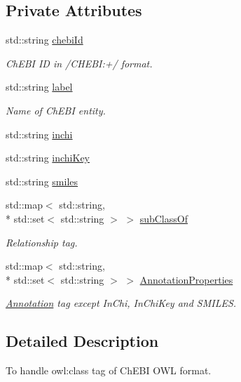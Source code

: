 \subsection*{Private Attributes}
\begin{DoxyCompactItemize}
\item 
std\-::string \hyperlink{classunisys_1_1ChEBIOWLClass_ab117174852af50b086c9baf28647be85}{chebi\-Id}
\begin{DoxyCompactList}\small\item\em Ch\-E\-B\-I I\-D in /\-C\-H\-E\-B\-I\-:+/ format. \end{DoxyCompactList}\item 
std\-::string \hyperlink{classunisys_1_1ChEBIOWLClass_a5069859deb537ea460525e98d277397c}{label}
\begin{DoxyCompactList}\small\item\em Name of Ch\-E\-B\-I entity. \end{DoxyCompactList}\item 
std\-::string \hyperlink{classunisys_1_1ChEBIOWLClass_a46b2c202643987ce0d4e3a105e117822}{inchi}
\item 
std\-::string \hyperlink{classunisys_1_1ChEBIOWLClass_af64b976dc7f141a4935898fcb470cefb}{inchi\-Key}
\item 
std\-::string \hyperlink{classunisys_1_1ChEBIOWLClass_ad36fc8f28f36623552de31e77095e570}{smiles}
\item 
std\-::map$<$ std\-::string, \\*
std\-::set$<$ std\-::string $>$ $>$ \hyperlink{classunisys_1_1ChEBIOWLClass_afac1eca0e61d1adcebd6d1feda765a63}{sub\-Class\-Of}
\begin{DoxyCompactList}\small\item\em Relationship tag. \end{DoxyCompactList}\item 
std\-::map$<$ std\-::string, \\*
std\-::set$<$ std\-::string $>$ $>$ \hyperlink{classunisys_1_1ChEBIOWLClass_a4f4fec0580d988965e1ab42c8aecbb59}{Annotation\-Properties}
\begin{DoxyCompactList}\small\item\em \hyperlink{classunisys_1_1Annotation}{Annotation} tag except In\-Chi, In\-Chi\-Key and S\-M\-I\-L\-E\-S. \end{DoxyCompactList}\end{DoxyCompactItemize}


\subsection{Detailed Description}
To handle owl\-:class tag of Ch\-E\-B\-I O\-W\-L format. 

